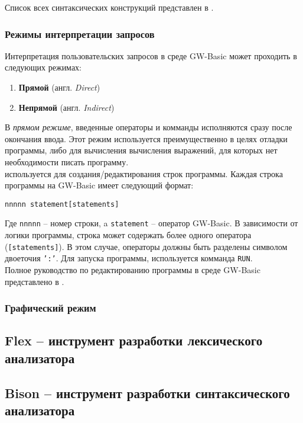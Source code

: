 \documentclass[12pt]{article}
\begin{document}
			\indent Список всех синтаксических конструкций представлен в \cite[стр.~117]{basicManual}.
			\subsubsection{Режимы интерпретации запросов}
			\hspace{\parindent} Интерпретация пользовательских запросов в среде GW-Basic может проходить в следующих режимах:
			\begin{enumerate}
				\item {\bf Прямой} (англ. {\it Direct}) 
				\item {\bf Непрямой} (англ. {\it Indirect}) 
			\end{enumerate}
			
			\indent В {\it прямом режиме}, введенные операторы и комманды исполняются сразу после окончания ввода. Этот режим используется преимущественно в целях отладки программы, либо для вычисления вычисления выражений, для которых нет необходимости писать программу. \\
			 используется для создания/редактирования строк программы. Каждая строка программы на GW-Basic имеет следующий формат:
			\begin{center}
				\tt nnnnn statement[statements]
			\end{center}

			\indent	Где {\tt nnnnn} -- номер строки, a {\tt statement} -- оператор GW-Basic. В зависимости от логики программы, строка может содержать более одного оператора ({\tt [statements]}). В этом случае, операторы должны быть разделены символом двоеточия {\tt ':'}. Для запуска программы, используется комманда {\tt RUN}.\\
			\indent Полное руководство по редактированию программы в среде GW-Basic представлено в \cite[стр.~18]{basicManual}.

			\subsubsection{Графический режим}

		\subsection{Flex -- инструмент разработки лексического анализатора}
		\subsection{Bison -- инструмент разработки синтаксического анализатора}
\end{document}
